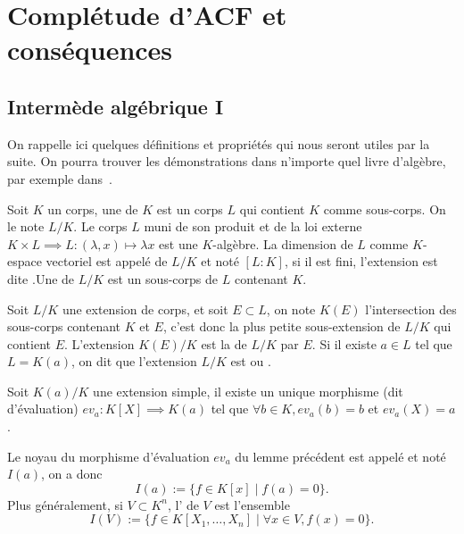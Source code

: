 
\chapter{Complétude d'ACF et conséquences}

\section{Intermède algébrique I}

On rappelle ici quelques définitions et propriétés qui nous seront utiles
par la suite. On pourra trouver les démonstrations
dans n'importe quel livre d'algèbre, par exemple dans~\cite{Berhuy_2025}.


\begin{defi}
Soit $K$ un corps, une  de $K$ est un corps $L$ qui contient $K$
comme sous-corps. On le note $L/K$. Le corps $L$ muni de son produit et de la
loi externe $K \times L \implies L:(\lambda,x)\mapsto \lambda x$ est une
$K$-algèbre. La dimension de $L$ comme $K$-espace vectoriel est appelé
 de $L/K$ et noté $[L:K]$, si il est fini, l'extension est dite
.Une  de $L/K$ est un
sous-corps de $L$ contenant $K$.
\end{defi}

\begin{defi}
Soit $L/K$ une extension de corps, et soit $E \subset L$, on note $K(E)$ l'intersection
des sous-corps contenant $K$ et $E$, c'est donc la plus petite sous-extension de
$L/K$ qui contient $E$. L'extension $K(E)/K$ est la  de $L/K$
 par $E$. Si il existe $a \in L$ tel que $L=K(a)$, on
dit que l'extension $L/K$ est  ou .
\end{defi}

\begin{lemm}
Soit $K(a)/K$ une extension simple, il existe un unique morphisme (dit
d'évaluation) $ev_a : K[X] \implies K(a)$ tel que $\forall b \in K,
ev_a(b)=b$ et $ev_a(X) = a$.
\end{lemm}


\begin{defi}\label{defi-ideal-annul}
Le noyau du morphisme d'évaluation $ev_a$ du lemme précédent est appelé
 et noté $I(a)$, on a donc \[ I(a) := \{ f \in K[x] \mid f(a) =
0 \}. \]
Plus généralement, si $V\subset K^n$, l' de $V$ est l'ensemble \[ I(V) := \{ f \in K[X_1, \ldots, X_n] \mid
\forall x \in V, f(x) = 0  \}. \]
\end{defi}  


